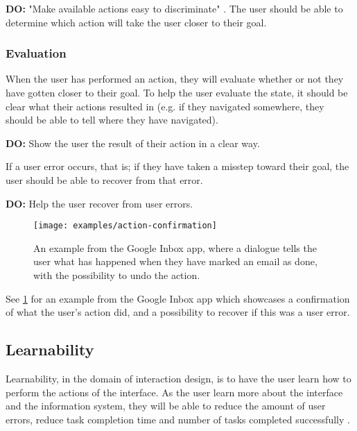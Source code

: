 \begin{displayquote}
  \textbf{DO:} "Make available actions easy to discriminate" \cite{Polson1990}. The user should be able to determine which action will take the user closer to their goal.
\end{displayquote}

\subsubsection{Evaluation}

When the user has performed an action, they will evaluate whether or not they have gotten closer to their goal. To help the user evaluate the state, it should be clear what their actions resulted in (e.g. if they navigated somewhere, they should be able to tell where they have navigated).

\begin{displayquote}
  \textbf{DO:} Show the user the result of their action in a clear way.
\end{displayquote}

If a user error occurs, that is; if they have taken a misstep toward their goal, the user should be able to recover from that error.

\begin{displayquote}
  \textbf{DO:} Help the user recover from user errors.
\end{displayquote}

\begin{figure}[h]
  \centering
    \texttt{[image: examples/action-confirmation]}
  \caption{An example from the Google Inbox app, where a dialogue tells the user what has happened when they have marked an email as done, with the possibility to undo the action.}
  \label{fig:examples/action-confirmation}
\end{figure}

See \ref{fig:examples/action-confirmation} for an example from the Google Inbox app which showcases a confirmation of what the user's action did, and a possibility to recover if this was a user error.

\subsection{Learnability}
Learnability, in the domain of interaction design, is to have the user learn how to perform the actions of the interface. As the user learn more about the interface and the information system, they will be able to reduce the amount of user errors, reduce task completion time and number of tasks completed successfully \cite{Leung2010}.

